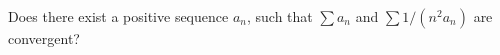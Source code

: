 Does there exist a positive sequence $a_n$, such that $\sum a_n$ and $\sum 1/(n^2a_n)$ are convergent?

